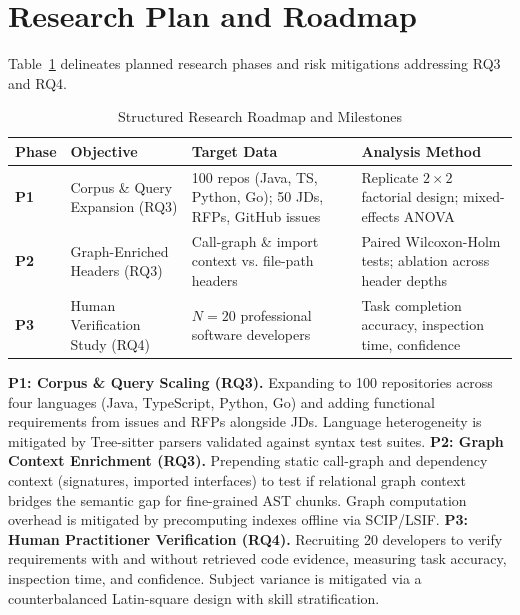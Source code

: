 \section{Research Plan and Roadmap}
\label{sec:plan}

Table~\ref{tab:roadmap} delineates planned research phases and risk mitigations addressing RQ3 and RQ4.

\begin{table}[t]
\caption{Structured Research Roadmap and Milestones}
\label{tab:roadmap}
\centering\scriptsize
\setlength{\tabcolsep}{2pt}
\begin{threeparttable}
\begin{tabular}{@{}lp{0.82in}p{1.02in}p{1.02in}@{}}
\toprule
Phase & Objective & Target Data & Analysis Method \\
\midrule
\textbf{P1} & Corpus \& Query Expansion (RQ3) & 100 repos (Java, TS, Python, Go); 50 JDs, RFPs, GitHub issues & Replicate $2 \times 2$ factorial design; mixed-effects ANOVA \\
\textbf{P2} & Graph-Enriched Headers (RQ3) & Call-graph \& import context vs. file-path headers & Paired Wilcoxon-Holm tests; ablation across header depths \\
\textbf{P3} & Human Verification Study (RQ4) & $N=20$ professional software developers & Task completion accuracy, inspection time, confidence \\
\bottomrule
\end{tabular}
\end{threeparttable}
\end{table}

\textbf{P1: Corpus \& Query Scaling (RQ3).} Expanding to 100 repositories across four languages (Java, TypeScript, Python, Go) and adding functional requirements from issues and RFPs alongside JDs. Language heterogeneity is mitigated by Tree-sitter parsers validated against syntax test suites.
\textbf{P2: Graph Context Enrichment (RQ3).} Prepending static call-graph and dependency context (signatures, imported interfaces) to test if relational graph context bridges the semantic gap for fine-grained AST chunks. Graph computation overhead is mitigated by precomputing indexes offline via SCIP/LSIF.
\textbf{P3: Human Practitioner Verification (RQ4).} Recruiting 20 developers to verify requirements with and without retrieved code evidence, measuring task accuracy, inspection time, and confidence. Subject variance is mitigated via a counterbalanced Latin-square design with skill stratification.
